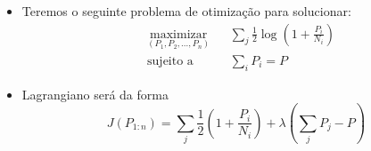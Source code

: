 \begin{frame}[allowframebreaks]
\begin{itemize}
  \item Teremos o seguinte problema de otimização para solucionar:
        \begin{equation}
        \begin{aligned}
        & \underset{(P_1, P_2, \ldots, P_n)}{\text{maximizar}}
        & & \sum_j \frac{1}{2} \log \left(1 + \frac{P_i}{N_i} \right) \\
        & \text{sujeito a} & & \sum_i P_i = P
        \end{aligned}
        \end{equation}

  \item Lagrangiano será da forma
	\begin{equation}
	J(P_{1:n}) = \sum_{j} \frac{1}{2} \left( 1 + \frac{P_i}{N_i} \right) + \lambda \left( \sum_{j} P_j - P \right)
	\end{equation}

  \end{itemize}
\end{frame} 


